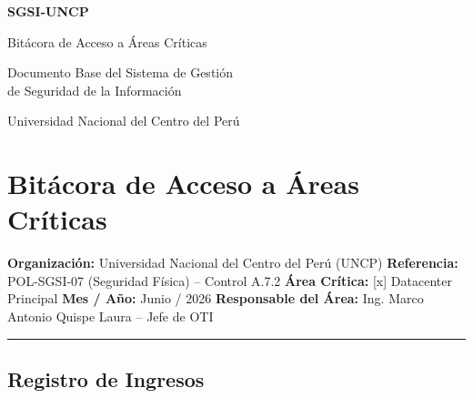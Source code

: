 \documentclass[10pt,letterpaper]{article}
\newcommand{\makecover}{
\begin{titlepage}
\centering
\vspace*{2cm}
{\Huge\bfseries\color{uncpblue} SGSI-UNCP\par}
\vspace{0.7cm}
{\LARGE Bitácora de Acceso a Áreas Críticas\par}
\vspace{0.5cm}
{\large Documento Base del Sistema de Gestión\\de Seguridad de la Información\par}
\vspace{1.5cm}
{\small Universidad Nacional del Centro del Perú\par}
\vfill
\end{titlepage}
}
\begin{document}
\makecover
\setcounter{tocdepth}{2}
\RaggedRight
\tableofcontents
\newpage

\RaggedRight
\section{Bitácora de Acceso a Áreas
Críticas}\label{bituxe1cora-de-acceso-a-uxe1reas-cruxedticas}

\textbf{Organización:} Universidad Nacional del Centro del Perú (UNCP)
\textbf{Referencia:} POL-SGSI-07 (Seguridad Física) -- Control A.7.2
\textbf{Área Crítica:} {[}x{]} Datacenter Principal \textbf{Mes / Año:}
Junio / 2026 \textbf{Responsable del Área:} Ing. Marco Antonio Quispe
Laura -- Jefe de OTI

\begin{center}\rule{0.5\linewidth}{0.5pt}\end{center}

\subsection{Registro de Ingresos}\label{registro-de-ingresos}
\end{document}
